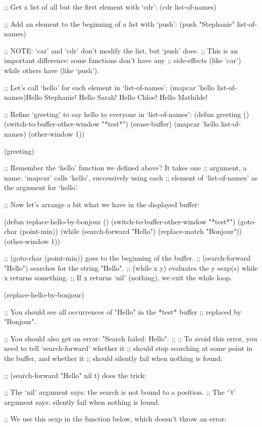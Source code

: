 ;; Get a list of all but the first element with `cdr':
(cdr list-of-names)

;; Add an element to the beginning of a list with `push':
(push "Stephanie" list-of-names)

;; NOTE: `car' and `cdr' don't modify the list, but `push' does.
;; This is an important difference: some functions don't have any
;; side-effects (like `car') while others have (like `push').

;; Let's call `hello' for each element in `list-of-names':
(mapcar 'hello list-of-names)Hello Stephanie!
Hello Sarah!
Hello Chloe!
Hello Mathilde!


;; Refine `greeting' to say hello to everyone in `list-of-names':
(defun greeting ()
    (switch-to-buffer-other-window "*test*")
    (erase-buffer)
    (mapcar 'hello list-of-names)
    (other-window 1))

(greeting)

;; Remember the `hello' function we defined above?  It takes one
;; argument, a name.  `mapcar' calls `hello', successively using each
;; element of `list-of-names' as the argument for `hello'.

;; Now let's arrange a bit what we have in the displayed buffer:

(defun replace-hello-by-bonjour ()
    (switch-to-buffer-other-window "*test*")
    (goto-char (point-min))
    (while (search-forward "Hello")
      (replace-match "Bonjour"))
    (other-window 1))

;; (goto-char (point-min)) goes to the beginning of the buffer.
;; (search-forward "Hello") searches for the string "Hello".
;; (while x y) evaluates the y sexp(s) while x returns something.
;; If x returns `nil' (nothing), we exit the while loop.

(replace-hello-by-bonjour)

;; You should see all occurrences of "Hello" in the *test* buffer
;; replaced by "Bonjour".

;; You should also get an error: "Search failed: Hello".
;;
;; To avoid this error, you need to tell `search-forward' whether it
;; should stop searching at some point in the buffer, and whether it
;; should silently fail when nothing is found:

;; (search-forward "Hello" nil t) does the trick:

;; The `nil' argument says: the search is not bound to a position.
;; The `'t' argument says: silently fail when nothing is found.

;; We use this sexp in the function below, which doesn't throw an error:

